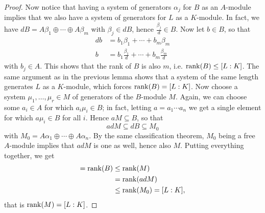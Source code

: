 \begin{proof}
	Now notice that having a system of generators $\alpha_j$ for $B$ as an $A$-module implies that we also have a system of generators for $L$ as a $K$-module. In fact, we have $dB=A\beta_1\oplus\cdots\oplus A\beta_m$ with $\beta_j\in dB$, hence $\frac{\beta_j}{d}\in B$. Now let $b\in B$, so that
	\begin{align*}
		db &= b_1\beta_1 + \cdots + b_m\beta_m\\
		b &= b_1\frac{\beta_1}{d} + \cdots + b_m\frac{\beta_m}{d}
	\end{align*}
	with $b_j\in A$. This shows that the rank of $B$ is also $m$, i.e. $\operatorname{rank}(B)\leq[L:K]$. The same argument as in the previous lemma shows that a system of the same length generates $L$ as a $K$-module, which forces $\operatorname{rank}(B)=[L:K]$. Now choose a system $\mu_1,\dots,\mu_r\in M$ of generators of the $B$-module $M$. Again, we can choose some $a_i\in A$ for which $a_i\mu_i\in B$; in fact, letting $a=a_1\cdots a_n$ we get a single element for which $a\mu_i\in B$ for all $i$. Hence $aM\subseteq B$, so that
	\[
		adM \subseteq dB \subseteq M_0
	\]
	with $M_0=A\alpha_1\oplus\cdots\oplus A\alpha_n$. By the same classification theorem, $M_0$ being a free $A$-module implies that $adM$ is one as well, hence also $M$. Putting everything together, we get
	\begin{align*}
		[L:K] = \rank(B) &\leq \rank(M)\\
			&= \rank(adM)\\
			&\leq \rank(M_0) = [L:K],
	\end{align*}
	that is $\operatorname{rank}(M)=[L:K]$.
\end{proof}

